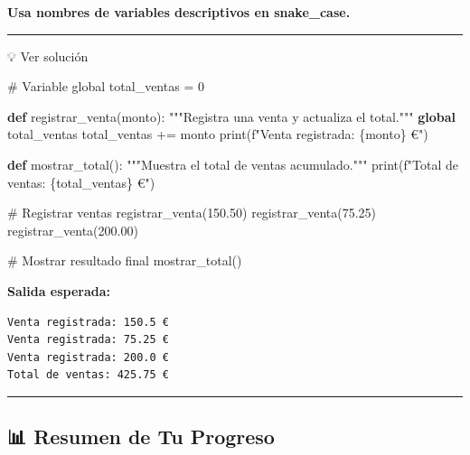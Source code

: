\documentclass[
  doc,
  floatsintext,
  longtable,
  a4paper,
  nolmodern,
  notxfonts,
  notimes,
  12pt,
  colorlinks=true,linkcolor=blue,citecolor=blue,urlcolor=blue]{apa7}
\newenvironment{Shaded}{\begin{snugshade}}{\end{snugshade}}
\newcommand{\BuiltInTok}[1]{\textcolor[rgb]{0.00,0.23,0.31}{#1}}
\newcommand{\CommentTok}[1]{\textcolor[rgb]{0.37,0.37,0.37}{#1}}
\newcommand{\DecValTok}[1]{\textcolor[rgb]{0.68,0.00,0.00}{#1}}
\newcommand{\FloatTok}[1]{\textcolor[rgb]{0.68,0.00,0.00}{#1}}
\newcommand{\KeywordTok}[1]{\textcolor[rgb]{0.00,0.23,0.31}{\textbf{#1}}}
\newcommand{\NormalTok}[1]{\textcolor[rgb]{0.00,0.23,0.31}{#1}}
\newcommand{\OperatorTok}[1]{\textcolor[rgb]{0.37,0.37,0.37}{#1}}
\newcommand{\SpecialCharTok}[1]{\textcolor[rgb]{0.37,0.37,0.37}{#1}}
\newcommand{\SpecialStringTok}[1]{\textcolor[rgb]{0.13,0.47,0.30}{#1}}
\begin{document}
\textbf{Usa nombres de variables descriptivos en snake\_case.}

\begin{center}\rule{0.5\linewidth}{0.5pt}\end{center}

💡 Ver solución

\begin{Shaded}
\begin{Highlighting}[]
\CommentTok{\# Variable global}
\NormalTok{total\_ventas }\OperatorTok{=} \DecValTok{0}

\KeywordTok{def}\NormalTok{ registrar\_venta(monto):}
    \CommentTok{"""Registra una venta y actualiza el total."""}
    \KeywordTok{global}\NormalTok{ total\_ventas}
\NormalTok{    total\_ventas }\OperatorTok{+=}\NormalTok{ monto}
    \BuiltInTok{print}\NormalTok{(}\SpecialStringTok{f"Venta registrada: }\SpecialCharTok{\{}\NormalTok{monto}\SpecialCharTok{\}}\SpecialStringTok{ €"}\NormalTok{)}

\KeywordTok{def}\NormalTok{ mostrar\_total():}
    \CommentTok{"""Muestra el total de ventas acumulado."""}
    \BuiltInTok{print}\NormalTok{(}\SpecialStringTok{f"Total de ventas: }\SpecialCharTok{\{}\NormalTok{total\_ventas}\SpecialCharTok{\}}\SpecialStringTok{ €"}\NormalTok{)}

\CommentTok{\# Registrar ventas}
\NormalTok{registrar\_venta(}\FloatTok{150.50}\NormalTok{)}
\NormalTok{registrar\_venta(}\FloatTok{75.25}\NormalTok{)}
\NormalTok{registrar\_venta(}\FloatTok{200.00}\NormalTok{)}

\CommentTok{\# Mostrar resultado final}
\NormalTok{mostrar\_total()}
\end{Highlighting}
\end{Shaded}

\textbf{Salida esperada:}

\begin{verbatim}
Venta registrada: 150.5 €
Venta registrada: 75.25 €
Venta registrada: 200.0 €
Total de ventas: 425.75 €
\end{verbatim}

\begin{center}\rule{0.5\linewidth}{0.5pt}\end{center}

\subsection{📊 Resumen de Tu Progreso}\label{resumen-de-tu-progreso}
\end{document}
